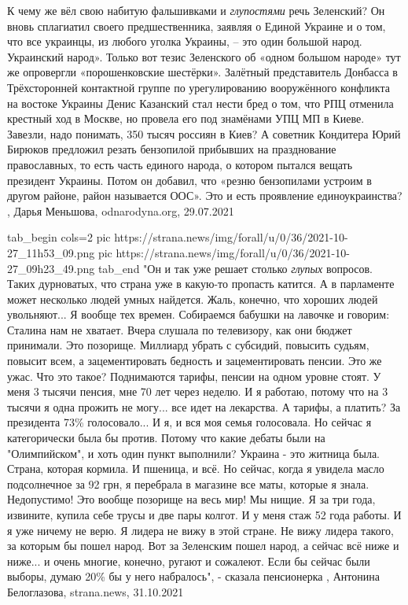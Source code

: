 К чему же вёл свою набитую фальшивками и \emph{глупостями} речь Зеленский? Он вновь
сплагиатил своего предшественника, заявляя о Единой Украине и о том, что все
украинцы, из любого уголка Украины, – это один большой народ. Украинский
народ».  Только вот тезис Зеленского об «одном большом народе» тут же
опровергли «порошенковские шестёрки». Залётный представитель Донбасса в
Трёхсторонней контактной группе по урегулированию вооружённого конфликта на
востоке Украины Денис Казанский стал нести бред о том, что РПЦ отменила
крестный ход в Москве, но провела его под знамёнами УПЦ МП в Киеве. Завезли,
надо понимать, 350 тысяч россиян в Киев?  А советник Кондитера Юрий Бирюков
предложил резать бензопилой прибывших на празднование православных, то есть
часть единого народа, о котором пытался вещать президент Украины. Потом он
добавил, что «резню бензопилами устроим в другом районе, район называется ООС».
Это и есть проявление единоукраинства?
, 
Дарья Меньшова, odnarodyna.org, 29.07.2021

\ifcmt
  tab_begin cols=2
     pic https://strana.news/img/forall/u/0/36/2021-10-27_11h53_09.png
     pic https://strana.news/img/forall/u/0/36/2021-10-27_09h23_49.png
  tab_end
\fi
"Он и так уже решает столько \emph{глупых} вопросов. Таких дурноватых, что страна уже
в какую-то пропасть катится. А в парламенте может несколько людей умных
найдется. Жаль, конечно, что хороших людей увольняют... Я вообще тех времен.
Собираемся бабушки на лавочке и говорим: Сталина нам не хватает. Вчера слушала
по телевизору, как они бюджет принимали. Это позорище. Миллиард убрать с
субсидий, повысить судьям, повысит всем, а зацементировать бедность и
зацементировать пенсии. Это же ужас. Что это такое? Поднимаются тарифы, пенсии
на одном уровне стоят. У меня 3 тысячи пенсия, мне 70 лет через неделю. И я
работаю, потому что на 3 тысячи я одна прожить не могу... все идет на
лекарства. А тарифы, а платить? За президента 73\% голосовало... И я, и вся моя
семья голосовала. Но сейчас я категорически была бы против. Потому что какие
дебаты были на "Олимпийском", и хоть один пункт выполнили? Украина - это
житница была. Страна, которая кормила. И пшеница, и всё. Но сейчас, когда я
увидела масло подсолнечное за 92 грн, я перебрала в магазине все маты, которые
я знала. Недопустимо! Это вообще позорище на весь мир! Мы нищие. Я за три года,
извините, купила себе трусы и две пары колгот. И у меня стаж 52 года работы. И
я уже ничему не верю. Я лидера не вижу в этой стране. Не вижу лидера такого, за
которым бы пошел народ. Вот за Зеленским пошел народ, а сейчас всё ниже и
ниже... и очень многие, конечно, ругают и сожалеют. Если бы сейчас были выборы,
думаю 20\% бы у него набралось", - сказала пенсионерка
, 
Антонина Белоглазова, strana.news, 31.10.2021
